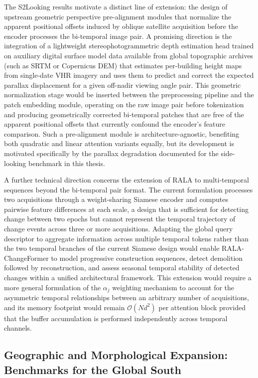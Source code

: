 The S2Looking results motivate a distinct line of extension: the design of upstream geometric perspective pre-alignment modules that normalize the apparent positional offsets induced by oblique satellite acquisition before the encoder processes the bi-temporal image pair. A promising direction is the integration of a lightweight stereophotogrammetric depth estimation head trained on auxiliary digital surface model data available from global topographic archives (such as SRTM or Copernicus DEM) that estimates per-building height maps from single-date \ac{VHR} imagery and uses them to predict and correct the expected parallax displacement for a given off-nadir viewing angle pair. This geometric normalization stage would be inserted between the preprocessing pipeline and the patch embedding module, operating on the raw image pair before tokenization and producing geometrically corrected bi-temporal patches that are free of the apparent positional offsets that currently confound the encoder's feature comparison. Such a pre-alignment module is architecture-agnostic, benefiting both quadratic and linear attention variants equally, but its development is motivated specifically by the parallax degradation documented for the side-looking benchmark in this thesis.

A further technical direction concerns the extension of \ac{RALA} to multi-temporal sequences beyond the bi-temporal pair format. The current formulation processes two acquisitions through a weight-sharing Siamese encoder and computes pairwise feature differences at each scale, a design that is sufficient for detecting change between two epochs but cannot represent the temporal trajectory of change events across three or more acquisitions. Adapting the global query descriptor to aggregate information across multiple temporal tokens rather than the two temporal branches of the current Siamese design would enable RALA-ChangeFormer to model progressive construction sequences, detect demolition followed by reconstruction, and assess seasonal temporal stability of detected changes within a unified architectural framework. This extension would require a more general formulation of the $\alpha_j$ weighting mechanism to account for the asymmetric temporal relationships between an arbitrary number of acquisitions, and its memory footprint would remain $\mathcal{O}(N d^2)$ per attention block provided that the buffer accumulation is performed independently across temporal channels.

\subsection*{Geographic and Morphological Expansion: Benchmarks for the
Global South}

